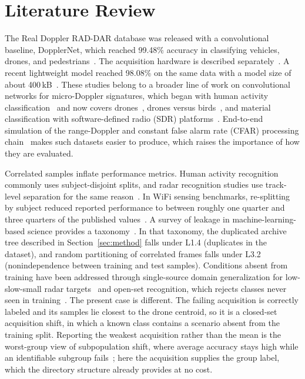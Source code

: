 \documentclass{ICIC2026}
\begin{document}
\section{Literature Review}
\label{sec:related}

The Real Doppler RAD-DAR database was released with a convolutional baseline, DopplerNet, which reached 99.48\% accuracy in classifying vehicles, drones, and pedestrians~\cite{roldan2020}. The acquisition hardware is described separately~\cite{quevedo2019}. A recent lightweight model reached 98.08\% on the same data with a model size of about 400\,kB~\cite{zhang2025}. These studies belong to a broader line of work on convolutional networks for micro-Doppler signatures, which began with human activity classification~\cite{kim2016} and now covers drones~\cite{ahmad2024}, drones versus birds~\cite{mustafa2026}, and material classification with software-defined radio (SDR) platforms~\cite{liaquat2025imm}. End-to-end simulation of the range-Doppler and constant false alarm rate (CFAR) processing chain~\cite{liaquat2024tut} makes such datasets easier to produce, which raises the importance of how they are evaluated.

Correlated samples inflate performance metrics. Human activity recognition commonly uses subject-disjoint splits, and radar recognition studies use track-level separation for the same reason~\cite{buchman2022}. In WiFi sensing benchmarks, re-splitting by subject reduced reported performance to between roughly one quarter and three quarters of the published values~\cite{varga2024a,varga2024b}. A survey of leakage in machine-learning-based science provides a taxonomy~\cite{kapoor2023}. In that taxonomy, the duplicated archive tree described in Section~\ref{sec:method} falls under L1.4 (duplicates in the dataset), and random partitioning of correlated frames falls under L3.2 (nonindependence between training and test samples). Conditions absent from training have been addressed through single-source domain generalization for low-slow-small radar targets~\cite{chen2025} and open-set recognition, which rejects classes never seen in training~\cite{bai2026}. The present case is different. The failing acquisition is correctly labeled and its samples lie closest to the drone centroid, so it is a closed-set acquisition shift, in which a known class contains a scenario absent from the training split. Reporting the weakest acquisition rather than the mean is the worst-group view of subpopulation shift, where average accuracy stays high while an identifiable subgroup fails~\cite{sagawa2020}; here the acquisition supplies the group label, which the directory structure already provides at no cost.
\end{document}
